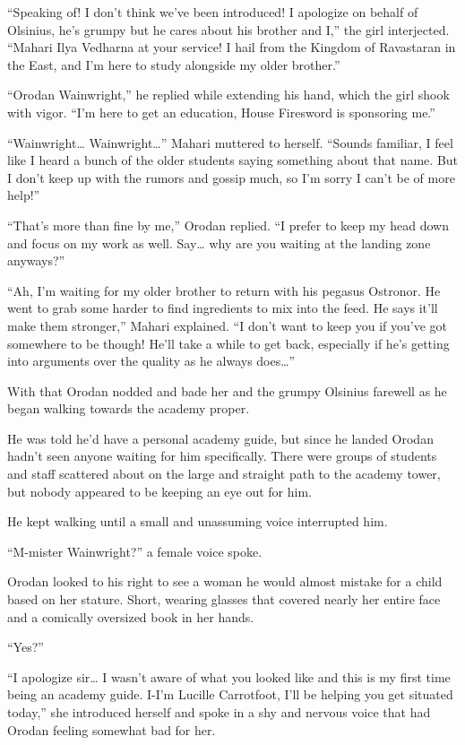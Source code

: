 \documentclass[a4paper,10pt]{book}
\begin{document}
“Speaking of! I don’t think we’ve been introduced! I apologize on behalf of Olsinius, he’s grumpy but he cares about his brother and I,” the girl interjected. “Mahari Ilya Vedharna at your service! I hail from the Kingdom of Ravastaran in the East, and I’m here to study alongside my older brother.”\par
“Orodan Wainwright,” he replied while extending his hand, which the girl shook with vigor. “I’m here to get an education, House Firesword is sponsoring me.”\par
“Wainwright… Wainwright…” Mahari muttered to herself. “Sounds familiar, I feel like I heard a bunch of the older students saying something about that name. But I don’t keep up with the rumors and gossip much, so I’m sorry I can’t be of more help!”\par
“That’s more than fine by me,” Orodan replied. “I prefer to keep my head down and focus on my work as well. Say… why are you waiting at the landing zone anyways?”\par
“Ah, I’m waiting for my older brother to return with his pegasus Ostronor. He went to grab some harder to find ingredients to mix into the feed. He says it’ll make them stronger,” Mahari explained. “I don’t want to keep you if you’ve got somewhere to be though! He’ll take a while to get back, especially if he’s getting into arguments over the quality as he always does…”\par
With that Orodan nodded and bade her and the grumpy Olsinius farewell as he began walking towards the academy proper.\par
He was told he’d have a personal academy guide, but since he landed Orodan hadn’t seen anyone waiting for him specifically. There were groups of students and staff scattered about on the large and straight path to the academy tower, but nobody appeared to be keeping an eye out for him.\par
He kept walking until a small and unassuming voice interrupted him.\par
“M-mister Wainwright?” a female voice spoke.\par
Orodan looked to his right to see a woman he would almost mistake for a child based on her stature. Short, wearing glasses that covered nearly her entire face and a comically oversized book in her hands.\par
“Yes?”\par
“I apologize sir… I wasn’t aware of what you looked like and this is my first time being an academy guide. I-I’m Lucille Carrotfoot, I’ll be helping you get situated today,” she introduced herself and spoke in a shy and nervous voice that had Orodan feeling somewhat bad for her.\par
\end{document}

